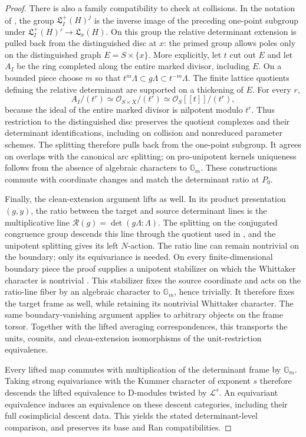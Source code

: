 \begin{proof}
There is also a family compatibility to check at collisions. In the
notation of \cite[Section~6.6.4]{GaitsgoryWhit}, the group
$\mathfrak L_I^+(H)^j$ is the inverse image of the preceding one-point
subgroup under
$\mathfrak L_I^+(H)'\to\mathfrak L_x(H)$. On this group the relative
determinant extension is pulled back from the distinguished disc at $x$:
the primed group allows poles only on the distinguished graph
$E=S\times\{x\}$. More explicitly, let $t$ cut out $E$ and let $A_I$
be the ring completed along the entire marked divisor, including $E$. On a bounded
piece choose $m$ so that
$t^m\Lambda\subset g\Lambda\subset t^{-m}\Lambda$. The finite
lattice quotients defining the relative determinant are supported on a
thickening of $E$. For every $r$,
\[
 A_I/(t^r)\simeq\mathcal O_{S\times X}/(t^r)
             \simeq\mathcal O_S[[t]]/(t^r),
\]
because the ideal of the entire marked divisor is nilpotent modulo
$t^r$. Thus restriction to the distinguished disc preserves the quotient
complexes and their determinant identifications, including on collision
and nonreduced parameter schemes. The splitting therefore pulls back from the one-point
subgroup. It agrees on overlaps with the canonical arc splitting;
on pro-unipotent kernels uniqueness follows from the absence of
algebraic characters to $\mathbb G_m$. These constructions commute with
coordinate changes and match the determinant ratio at $P_0$.

Finally, the clean-extension argument lifts as well. In its product
presentation $(g,y)$, the ratio between the target and source determinant
lines is the multiplicative line
$\mathcal R(g)=\det(g\Lambda:\Lambda)$. The splitting on the
conjugated congruence group descends this line through the quotient used
in \cite[Appendix~A.2]{GaitsgoryWhit}, and the unipotent splitting gives
its left $N$-action. The ratio line can remain nontrivial on the boundary;
only its equivariance is needed. On every finite-dimensional boundary
piece the proof supplies a unipotent
stabilizer on which the Whittaker character is nontrivial
\cite[Appendix~A.2--A.3]{GaitsgoryWhit}. This stabilizer fixes the source coordinate and acts on the ratio-line
fiber by an algebraic character to $\mathbb G_m$, hence trivially. It
therefore fixes the target frame as well, while retaining its nontrivial
Whittaker character. The same boundary-vanishing argument
applies to arbitrary objects on the frame torsor. Together with the
lifted averaging correspondences, this transports the units, counits,
and clean-extension isomorphisms of the unit-restriction equivalence.

Every lifted map commutes with multiplication of the determinant frame by
$\mathbb G_m$. Taking strong equivariance with the Kummer character of
exponent $s$ therefore descends the lifted equivalence to D-modules
twisted by $\mathcal L^s$. An equivariant equivalence induces an
equivalence on these descent categories, including their full
cosimplicial descent data. This yields the stated determinant-level
comparison, and preserves its base and Ran compatibilities.
\end{proof}

